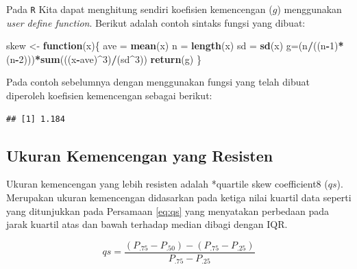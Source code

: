 \documentclass[]{book}
\newenvironment{Shaded}{\begin{snugshade}}{\end{snugshade}}
\newcommand{\KeywordTok}[1]{\textcolor[rgb]{0.13,0.29,0.53}{\textbf{#1}}}
\newcommand{\DecValTok}[1]{\textcolor[rgb]{0.00,0.00,0.81}{#1}}
\newcommand{\StringTok}[1]{\textcolor[rgb]{0.31,0.60,0.02}{#1}}
\newcommand{\ControlFlowTok}[1]{\textcolor[rgb]{0.13,0.29,0.53}{\textbf{#1}}}
\newcommand{\OperatorTok}[1]{\textcolor[rgb]{0.81,0.36,0.00}{\textbf{#1}}}
\newcommand{\NormalTok}[1]{#1}
\begin{document}
Pada \texttt{R} Kita dapat menghitung sendiri koefisien kemencengan
(\(g\)) menggunakan \emph{user define function}. Berikut adalah contoh
sintaks fungsi yang dibuat:

\begin{Shaded}
\begin{Highlighting}[]
\NormalTok{skew <-}\StringTok{ }\ControlFlowTok{function}\NormalTok{(x)\{}
\NormalTok{  ave =}\StringTok{ }\KeywordTok{mean}\NormalTok{(x)}
\NormalTok{  n =}\StringTok{ }\KeywordTok{length}\NormalTok{(x)}
\NormalTok{  sd =}\StringTok{ }\KeywordTok{sd}\NormalTok{(x)}
\NormalTok{  g=(n}\OperatorTok{/}\NormalTok{((n}\OperatorTok{-}\DecValTok{1}\NormalTok{)}\OperatorTok{*}\NormalTok{(n}\OperatorTok{-}\DecValTok{2}\NormalTok{)))}\OperatorTok{*}\KeywordTok{sum}\NormalTok{(((x}\OperatorTok{-}\NormalTok{ave)}\OperatorTok{^}\DecValTok{3}\NormalTok{)}\OperatorTok{/}\NormalTok{(sd}\OperatorTok{^}\DecValTok{3}\NormalTok{))}
  \KeywordTok{return}\NormalTok{(g)}
\NormalTok{\}}
\end{Highlighting}
\end{Shaded}

Pada contoh sebelumnya dengan menggunakan fungsi yang telah dibuat
diperoleh koefisien kemencengan sebagai berikut:

\begin{Shaded}
\end{Shaded}

\begin{verbatim}
## [1] 1.184
\end{verbatim}

\subsection{Ukuran Kemencengan yang
Resisten}\label{ukuran-kemencengan-yang-resisten}

Ukuran kemencengan yang lebih resisten adalah *quartile skew
coefficient8 (\(qs\)). Merupakan ukuran kemencengan didasarkan pada
ketiga nilai kuartil data seperti yang ditunjukkan pada Persamaan
\eqref{eq:qs} yang menyatakan perbedaan pada jarak kuartil atas dan bawah
terhadap median dibagi dengan IQR.

\begin{equation}
  qs=\frac{\left(P_{.75}-P_{.50}\right)-\left(P_{.75}-P_{.25}\right)}{P_{.75}-P_{.25}}
  \label{eq:qs}
\end{equation}
\end{document}
